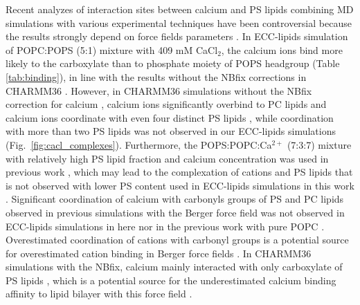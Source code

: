 \documentclass[journal=jpcbfk,manuscript=article]{achemso}
\begin{document}
Recent analyzes of interaction sites between calcium and PS lipids combining
MD simulations with various experimental techniques have been 
controversial because the results strongly depend on force fields parameters \cite{melcrova16,valentine18,hallock18}.
In ECC-lipids simulation of POPC:POPS (5:1) mixture with 409 mM CaCl$_2$,
the calcium ions bind more likely 
to the carboxylate than to phosphate moiety of POPS headgroup (Table \ref{tab:binding}),
in line with the results without the NBfix corrections in CHARMM36 \cite{hallock18}.
However, in CHARMM36 simulations without the NBfix correction for calcium \cite{kim16},
calcium ions significantly overbind to PC lipids  \cite{catte16} and calcium ions coordinate
with even four distinct PS lipids \cite{hallock18}, while coordination with more than two PS lipids
was not observed in our ECC-lipids simulations (Fig.~\ref{fig:cacl_complexes}).
Furthermore, the POPS:POPC:Ca$^{2+}$ (7:3:7) mixture with relatively high
PS lipid fraction and calcium concentration was used in previous work \cite{hallock18},
which may lead to the complexation of  cations and PS lipids that is
not observed with lower PS content used in ECC-lipids simulations in this work \cite{hauser77,kurland79,hauser85,feigenson86,mattai89,roux90,roux91}.
Significant coordination of calcium with carbonyls groups of PS and PC lipids observed in previous
simulations with the Berger force field \cite{melcrova16} %
was not observed in ECC-lipids simulations in here nor in the previous work with pure POPC \cite{melcr18}.
Overestimated coordination of cations with carbonyl groups is a potential source for
overestimated cation binding in Berger force fields \cite{catte16,NMRlipidsIV}. 
In CHARMM36 simulations with the NBfix, calcium mainly interacted with only
carboxylate of PS lipids  \cite{valentine18}, which is a potential source for the
underestimated calcium binding affinity to lipid bilayer with this force field \cite{NMRlipidsIV}. 
\end{document}
